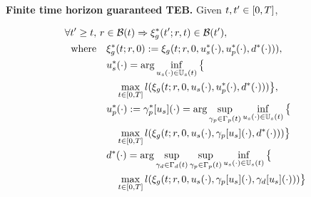 \begin{prop}
  \label{prop:nonconv}
  \textbf{Finite time horizon guaranteed TEB.}
  Given $t, t' \in [0, T]$,
  
  \begin{subequations} \label{eq:fin_thor_prop}
      \begin{align}
      \forall \tvar' \ge \tvar, &~ \rstate \in \TEB(\tvar) \Rightarrow \rtraj^*(\tvar'; \rstate, \tvar) \in \TEB(\tvar'), \\
      \text{where} &\quad \rtraj^*(\tvar; \rstate, 0) := \rtraj(\tvar; \rstate, 0, \tctrl^*(\cdot), \pctrl^*(\cdot), \dstb^*(\cdot))), \label{eq:fin_thor_prop:here} \\
      &\quad
      \begin{aligned}
      &\tctrl^*(\cdot) = \arg \inf_{\tctrl(\cdot)\in\tcfset(t)}\big\{\\
      & \quad \max_{\tvar \in [0, \thor]} \errfunc(\rtraj(\tvar; \rstate, 0, \tctrl(\cdot), \pctrl^*(\cdot), \dstb^*(\cdot))) \big\},\\
      \end{aligned} \\
      &\quad
      \begin{aligned}
      & \pctrl^*(\cdot) := \gamma_\pstate^*[\tctrl](\cdot) = \arg \sup_{\gamma_{\pstate} \in \Gamma_\pstate(t)} \inf_{\tctrl(\cdot) \in \tcfset(t)} \big\{ \\
      & \quad \max_{t \in [0, \thor]} \errfunc(\rtraj(\tvar; \rstate, 0, \tctrl(\cdot), \gamma_\pstate[\tctrl](\cdot), \dstb^*(\cdot))) \big\} \\
      \end{aligned} \\
      &\quad
      \begin{aligned}
      & \dstb^*(\cdot) = \arg \sup_{\gamma_{\dstb} \in \Gamma_\dstb(t)} \sup_{\gamma_{\pstate} \in \Gamma_\pstate(t)} \inf_{\tctrl(\cdot) \in \tcfset(t)} \big\{\\
      & \quad \max_{\tvar \in [0, \thor]} \errfunc(\rtraj(\tvar; \rstate, 0, \tctrl(\cdot), \gamma_\pstate[\tctrl](\cdot), \gamma_\dstb[\tctrl](\cdot))) \big\}
      \end{aligned} \label{eq:fin_thor_prop:there}
      \end{align}
  \end{subequations}

\end{prop}

